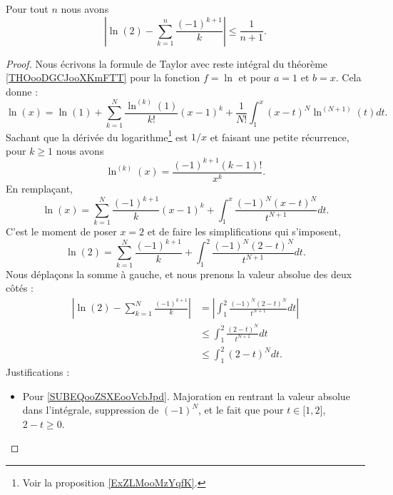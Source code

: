 \begin{proposition}       \label{PROPooHOMYooFclkCU}
	Pour tout \( n\) nous avons
	\begin{equation}
		\left| \ln(2)-\sum_{k=1}^n\frac{ (-1)^{k+1} }{ k } \right|\leq \frac{1}{ n+1 }.
	\end{equation}
\end{proposition}

\begin{proof}
	Nous écrivons la formule de Taylor avec reste intégral du théorème \ref{THOooDGCJooXKmFTT} pour la fonction \( f=\ln\) et pour \( a=1\) et \( b=x\). Cela donne :
	\begin{equation}
		\ln(x)=\ln(1)+\sum_{k=1}^N\frac{ \ln^{(k)}(1) }{ k! }(x-1)^k+\frac{1}{ N! }\int_1^x(x-t)^N\ln^{(N+1)}(t)dt.
	\end{equation}
	Sachant que la dérivée du logarithme\footnote{Voir la proposition \ref{ExZLMooMzYqfK}.} est \( 1/x\) et faisant une petite récurrence, pour \( k\geq 1\) nous avons
	\begin{equation}
		\ln^{(k)}(x)=\frac{ (-1)^{k+1}(k-1)! }{ x^k }.
	\end{equation}
	En remplaçant,
	\begin{equation}
		\ln(x)=\sum_{k=1}^N\frac{ (-1)^{k+1} }{ k }(x-1)^k+\int_1^x\frac{ (-1)^N(x-t)^N }{ t^{N+1} }dt.
	\end{equation}
	C'est le moment de poser \( x=2\) et de faire les simplifications qui s'imposent,
	\begin{equation}
		\ln(2)=\sum_{k=1}^N\frac{ (-1)^{k+1} }{ k }+\int_1^2\frac{ (-1)^N(2-t)^N }{ t^{N+1} }dt.
	\end{equation}
	Nous déplaçons la somme à gauche, et nous prenons la valeur absolue des deux côtés :
	\begin{subequations}
		\begin{align}
			| \ln(2)-\sum_{k=1}^N\frac{ (-1)^{k+1} }{ k } | & =| \int_1^2\frac{ (-1)^N(2-t)^N }{ t^{N+1} }dt |                      \\
			                                                & \leq\int_1^2\frac{ (2-t)^N }{ t^{N+1} }dt \label{SUBEQooZSXEooVcbJpd} \\
			                                                & \leq \int_1^2(2-t)^Ndt       \label{SUBEQooHGZLooGIhoVt}.
		\end{align}
	\end{subequations}
	Justifications :
	\begin{itemize}
		\item Pour \ref{SUBEQooZSXEooVcbJpd}. Majoration en rentrant la valeur absolue dans l'intégrale, suppression de \( (-1)^N\), et le fait que pour \( t\in \mathopen[ 1 , 2 \mathclose]\), \( 2-t\geq 0\).

\end{itemize}
\end{proof}
